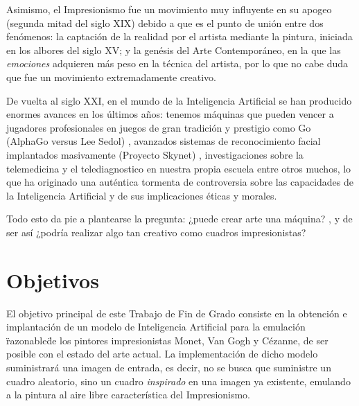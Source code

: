 \documentclass[../main.tex]{subfiles}
\begin{document}
\newpage
Asimismo, el Impresionismo fue un movimiento muy influyente en su apogeo (segunda mitad del siglo XIX) debido a que es el punto de unión entre dos fenómenos: la captación de la realidad por el artista mediante la pintura, iniciada en los albores del siglo XV; y la genésis del Arte Contemporáneo, en la que las \textit{emociones} adquieren más peso en la técnica del artista, por lo que no cabe duda que fue un movimiento extremadamente creativo.
\newline

De vuelta al siglo XXI, en el mundo de la Inteligencia Artificial se han producido enormes avances en los últimos años: tenemos máquinas que pueden vencer a jugadores profesionales en juegos de gran tradición y prestigio como Go (AlphaGo versus Lee Sedol) \cite{Metz2016}, avanzados sistemas de reconocimiento facial implantados masivamente (Proyecto Skynet) \cite{Diez2019}, investigaciones sobre la telemedicina y el telediagnostico en nuestra propia escuela \cite{Aldana2019} entre otros muchos, lo que ha originado una auténtica tormenta de controversia sobre las capacidades de la Inteligencia Artificial y de sus implicaciones éticas y morales.
\newline

Todo esto da pie a plantearse la pregunta: ¿puede crear arte una máquina? \cite{Garcia2017} \cite{Serradilla2017}, y de ser así ¿podría realizar algo tan creativo como cuadros impresionistas?
\section{Objetivos}
El objetivo principal de este Trabajo de Fin de Grado consiste en la obtención e implantación de un modelo de Inteligencia Artificial para la emulación \"razonable\" de los pintores impresionistas Monet, Van Gogh y Cézanne, de ser posible con el estado del arte actual. La implementación de dicho modelo suministrará una imagen de entrada, es decir, no se busca que suministre un cuadro aleatorio, sino un cuadro \textit{inspirado} en una imagen ya existente, emulando a la pintura al aire libre característica del Impresionismo.
\end{document}
